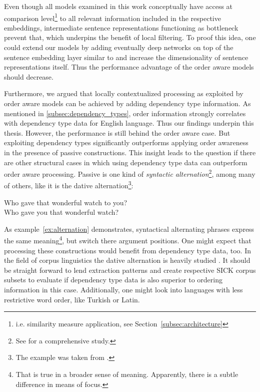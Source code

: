 
Even though all models examined in this work conceptually have access at comparison level\footnote{i.e. similarity measure application, see Section~\ref{subsec:architecture}} to all relevant information included in the respective embeddings, intermediate sentence representations functioning as bottleneck prevent that, which underpins the benefit of local filtering. To proof this idea, one could extend our models by adding eventually deep networks on top of the sentence embedding layer similar to \textcite{iyyer_deep_2015} and increase the dimensionality of sentence representations itself. Thus the performance advantage of the order aware models should decrease.

Furthermore, we argued that locally contextualized processing as exploited by order aware models can be achieved by adding dependency type information. As mentioned in \ref{subsec:dependency_types}, order information strongly correlates with dependency type data for English language. Thus our findings underpin this thesis. However, the performance is still behind the order aware case. But exploiting dependency types significantly outperforms applying order awareness in the presence of passive constructions. This insight leads to the question if there are other structural cases in which using dependency type data can outperform order aware processing. Passive is one kind of \textit{syntactic alternation}\footnote{See \autocite{levin_english_1993} for a comprehensive study.}, among many of others, like it is the dative alternation\footnote{The example was taken from \autocite{kendall_dative_2011}.}:
\begin{exe}
	\ex \label{ex:alternation} Who gave that wonderful watch to you? \\
	Who gave you that wonderful watch?
\end{exe}
As example~\ref{ex:alternation} demonstrates, syntactical alternating phrases express the same meaning\footnote{That is true in a broader sense of meaning. Apparently, there is a subtle difference in means of focus.}, but switch there argument positions. One might expect that processing these constructions would benefit from dependency type data, too. In the field of corpus linguistics the dative alternation is heavily studied \autocite{lapata_acquiring_1999,bresnan_gradience_2003,bresnan2007predicting,kendall_dative_2011}. It should be straight forward to lend extraction patterns and create respective SICK corpus subsets to evaluate if dependency type data is also superior to ordering information in this case. Additionally, one might look into languages with less restrictive word order, like Turkish or Latin.

